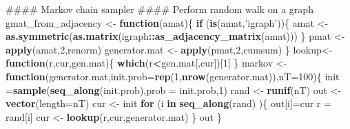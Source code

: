 \documentclass[]{article}
\newenvironment{Shaded}{\begin{snugshade}}{\end{snugshade}}
\newcommand{\KeywordTok}[1]{\textcolor[rgb]{0.13,0.29,0.53}{\textbf{#1}}}
\newcommand{\DataTypeTok}[1]{\textcolor[rgb]{0.13,0.29,0.53}{#1}}
\newcommand{\DecValTok}[1]{\textcolor[rgb]{0.00,0.00,0.81}{#1}}
\newcommand{\StringTok}[1]{\textcolor[rgb]{0.31,0.60,0.02}{#1}}
\newcommand{\ControlFlowTok}[1]{\textcolor[rgb]{0.13,0.29,0.53}{\textbf{#1}}}
\newcommand{\OperatorTok}[1]{\textcolor[rgb]{0.81,0.36,0.00}{\textbf{#1}}}
\newcommand{\NormalTok}[1]{#1}
\theoremstyle{definition}
\theoremstyle{definition}
\theoremstyle{definition}
\theoremstyle{remark}
\begin{document}
\begin{Shaded}
\begin{Highlighting}[]
\NormalTok{#### Markov chain sampler}
\NormalTok{#### Perform random walk on a graph}
\NormalTok{gmat_from_adjacency <-}\StringTok{ }\ControlFlowTok{function}\NormalTok{(amat)\{}
  \ControlFlowTok{if}\NormalTok{ (}\KeywordTok{is}\NormalTok{(amat,}\StringTok{'igraph'}\NormalTok{))\{}
\NormalTok{    amat <-}\StringTok{ }\KeywordTok{as.symmetric}\NormalTok{(}\KeywordTok{as.matrix}\NormalTok{(igraph}\OperatorTok{::}\KeywordTok{as_adjacency_matrix}\NormalTok{(amat)))}
\NormalTok{  \}}
\NormalTok{  pmat <-}\StringTok{ }\KeywordTok{apply}\NormalTok{(amat,}\DecValTok{2}\NormalTok{,renorm)}
\NormalTok{  generator.mat <-}\StringTok{ }\KeywordTok{apply}\NormalTok{(pmat,}\DecValTok{2}\NormalTok{,cumsum)}
\NormalTok{\}}
\NormalTok{lookup<-}\ControlFlowTok{function}\NormalTok{(r,cur,gen.mat)\{}
  \KeywordTok{which}\NormalTok{(r}\OperatorTok{<}\NormalTok{gen.mat[,cur])[}\DecValTok{1}\NormalTok{]}
\NormalTok{\}}
\NormalTok{markov <-}\StringTok{ }\ControlFlowTok{function}\NormalTok{(generator.mat,}\DataTypeTok{init.prob=}\KeywordTok{rep}\NormalTok{(}\DecValTok{1}\NormalTok{,}\KeywordTok{nrow}\NormalTok{(generator.mat)),}\DataTypeTok{nT=}\DecValTok{100}\NormalTok{)\{}
\NormalTok{  init =}\KeywordTok{sample}\NormalTok{(}\KeywordTok{seq_along}\NormalTok{(init.prob),}\DataTypeTok{prob =}\NormalTok{ init.prob,}\DecValTok{1}\NormalTok{)}
\NormalTok{  rand <-}\StringTok{ }\KeywordTok{runif}\NormalTok{(nT)}
\NormalTok{  out <-}\StringTok{ }\KeywordTok{vector}\NormalTok{(}\DataTypeTok{length=}\NormalTok{nT)}
\NormalTok{  cur <-}\StringTok{ }\NormalTok{init}
  \ControlFlowTok{for}\NormalTok{ (i }\ControlFlowTok{in} \KeywordTok{seq_along}\NormalTok{(rand) )\{}
\NormalTok{    out[i]=cur}
\NormalTok{    r =}\StringTok{ }\NormalTok{rand[i]}
\NormalTok{    cur <-}\StringTok{ }\KeywordTok{lookup}\NormalTok{(r,cur,generator.mat)}
\NormalTok{  \}}
\NormalTok{  out}
\NormalTok{\}}




\end{Highlighting}
\end{Shaded}
\end{document}
